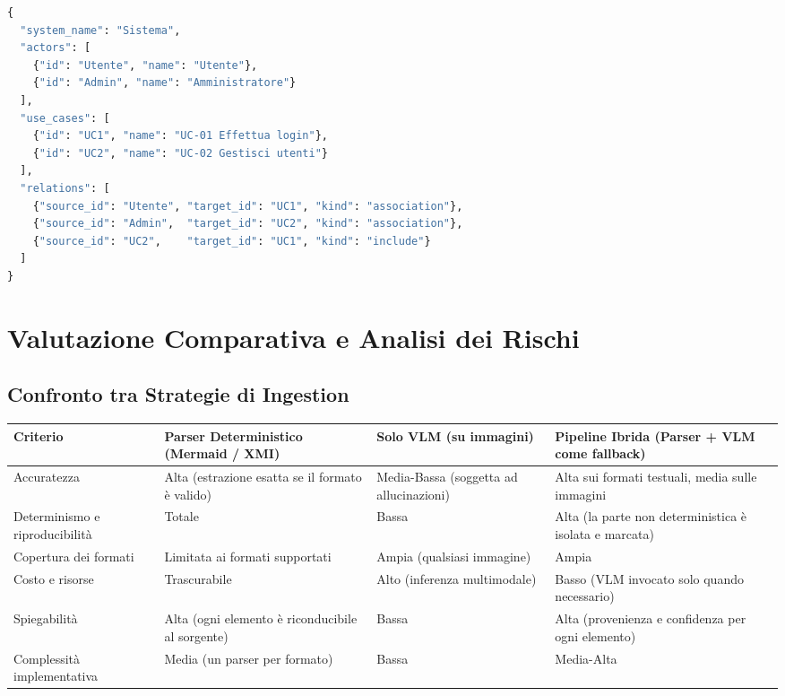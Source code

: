 \documentclass[a4paper, 11pt]{article}
\begin{document}
\begin{lstlisting}[language=Python, caption={Estratto della rappresentazione intermedia ottenuta dal diagramma precedente (JSON).}]
{
  "system_name": "Sistema",
  "actors": [
    {"id": "Utente", "name": "Utente"},
    {"id": "Admin", "name": "Amministratore"}
  ],
  "use_cases": [
    {"id": "UC1", "name": "UC-01 Effettua login"},
    {"id": "UC2", "name": "UC-02 Gestisci utenti"}
  ],
  "relations": [
    {"source_id": "Utente", "target_id": "UC1", "kind": "association"},
    {"source_id": "Admin",  "target_id": "UC2", "kind": "association"},
    {"source_id": "UC2",    "target_id": "UC1", "kind": "include"}
  ]
}
\end{lstlisting}

\section{Valutazione Comparativa e Analisi dei Rischi}

\subsection{Confronto tra Strategie di Ingestion}

\vspace{0.3cm}
\noindent
\renewcommand{\arraystretch}{1.3}
\begin{tabularx}{\textwidth}{|l|X|X|X|}
    \hline
    \textbf{Criterio} & \textbf{Parser Deterministico (Mermaid / XMI)} & \textbf{Solo VLM (su immagini)} & \textbf{Pipeline Ibrida (Parser + VLM come fallback)} \\ \hline
    Accuratezza & Alta (estrazione esatta se il formato è valido) & Media-Bassa (soggetta ad allucinazioni) & Alta sui formati testuali, media sulle immagini \\ \hline
    Determinismo e riproducibilità & Totale & Bassa & Alta (la parte non deterministica è isolata e marcata) \\ \hline
    Copertura dei formati & Limitata ai formati supportati & Ampia (qualsiasi immagine) & Ampia \\ \hline
    Costo e risorse & Trascurabile & Alto (inferenza multimodale) & Basso (VLM invocato solo quando necessario) \\ \hline
    Spiegabilità & Alta (ogni elemento è riconducibile al sorgente) & Bassa & Alta (provenienza e confidenza per ogni elemento) \\ \hline
    Complessità implementativa & Media (un parser per formato) & Bassa & Media-Alta \\ \hline
\end{tabularx}
\vspace{0.3cm}
\end{document}
